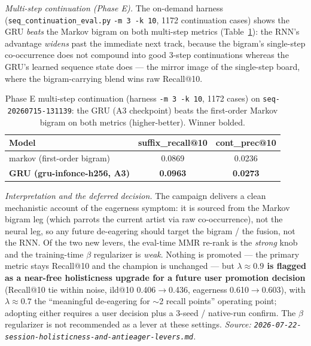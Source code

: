 \documentclass[11pt]{article}
\newcommand{\dsid}[1]{\texttt{\small #1}}
\newcommand{\best}[1]{\textbf{#1}}
\begin{document}
\emph{Multi-step continuation (Phase E).} The on-demand harness
(\texttt{seq\_continuation\_eval.py} \texttt{-m 3 -k 10}, \num{1172} continuation
cases) shows the GRU \emph{beats} the Markov bigram on both multi-step metrics
(Table~\ref{tab:nexttrack-continuation}): the RNN's advantage \emph{widens} past the immediate
next track, because the bigram's single-step co-occurrence does not compound into
good 3-step continuations whereas the GRU's learned sequence state does --- the
mirror image of the single-step board, where the bigram-carrying blend wins raw
Recall@10.

\begin{table}[ht]
  \centering
  \caption{Phase E multi-step continuation (harness \texttt{-m 3 -k 10},
  \num{1172} cases) on \dsid{seq-20260715-131139}: the GRU (A3 checkpoint) beats the
  first-order Markov bigram on both metrics (higher-better). Winner bolded.}
  \label{tab:nexttrack-continuation}
  {\footnotesize\setlength{\tabcolsep}{6pt}\begin{tabular}{lcc}
    \toprule
    Model & suffix\_recall@10 & cont\_prec@10 \\
    \midrule
    markov (first-order bigram) & 0.0869 & 0.0236 \\
    \best{GRU (gru-infonce-h256, A3)} & \best{0.0963} & \best{0.0273} \\
    \bottomrule
  \end{tabular}}
\end{table}

\emph{Interpretation and the deferred decision.} The campaign delivers a clean
mechanistic account of the eagerness symptom: it is sourced from the Markov bigram
leg (which parrots the current artist via raw co-occurrence), not the neural leg, so
any future de-eagering should target the bigram / the fusion, not the RNN. Of the two
new levers, the eval-time MMR re-rank is the \emph{strong} knob and the training-time
$\beta$ regularizer is \emph{weak}. Nothing is promoted --- the primary metric stays
Recall@10 and the champion is unchanged --- but \textbf{$\lambda\approx\num{0.9}$ is
flagged as a near-free holisticness upgrade for a future user promotion decision}
(Recall@10 tie within noise, ild@10 \num{0.406}$\to$\num{0.436}, eagerness
\num{0.610}$\to$\num{0.603}), with $\lambda\approx\num{0.7}$ the ``meaningful
de-eagering for $\sim$2 recall points'' operating point; adopting either requires a
user decision plus a 3-seed / native-run confirm. The $\beta$ regularizer is not
recommended as a lever at these settings.
\emph{Source: \texttt{2026-07-22-session-holisticness-and-antieager-levers.md}.}
\end{document}

